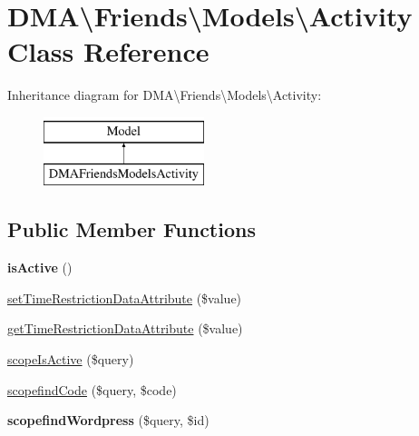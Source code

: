\hypertarget{classDMA_1_1Friends_1_1Models_1_1Activity}{\section{D\-M\-A\textbackslash{}Friends\textbackslash{}Models\textbackslash{}Activity Class Reference}
\label{classDMA_1_1Friends_1_1Models_1_1Activity}
}
Inheritance diagram for D\-M\-A\textbackslash{}Friends\textbackslash{}Models\textbackslash{}Activity\-:\begin{figure}[H]
\begin{center}
\leavevmode
\includegraphics[height=2.000000cm]{dc/d8c/classDMA_1_1Friends_1_1Models_1_1Activity}
\end{center}
\end{figure}
\subsection*{Public Member Functions}
\begin{DoxyCompactItemize}
\item 
\hypertarget{classDMA_1_1Friends_1_1Models_1_1Activity_aa5a4543ce44bd5b87fee0651c2102daf}{{\bfseries is\-Active} ()}\label{classDMA_1_1Friends_1_1Models_1_1Activity_aa5a4543ce44bd5b87fee0651c2102daf}

\item 
\hyperlink{classDMA_1_1Friends_1_1Models_1_1Activity_ade0ffca24448c217def365d104e52866}{set\-Time\-Restriction\-Data\-Attribute} (\$value)
\item 
\hyperlink{classDMA_1_1Friends_1_1Models_1_1Activity_a98a904c739aca30f2a26152a481164b6}{get\-Time\-Restriction\-Data\-Attribute} (\$value)
\item 
\hyperlink{classDMA_1_1Friends_1_1Models_1_1Activity_acd3f12824d95be07b5221cdc9d64abf7}{scope\-Is\-Active} (\$query)
\item 
\hyperlink{classDMA_1_1Friends_1_1Models_1_1Activity_a9bb36aab36ff22a29b2a594617dd591c}{scopefind\-Code} (\$query, \$code)
\item 
\hypertarget{classDMA_1_1Friends_1_1Models_1_1Activity_a5a533a3f638f99d1dd0a8e0550def49e}{{\bfseries scopefind\-Wordpress} (\$query, \$id)}\label{classDMA_1_1Friends_1_1Models_1_1Activity_a5a533a3f638f99d1dd0a8e0550def49e}

\end{DoxyCompactItemize}
